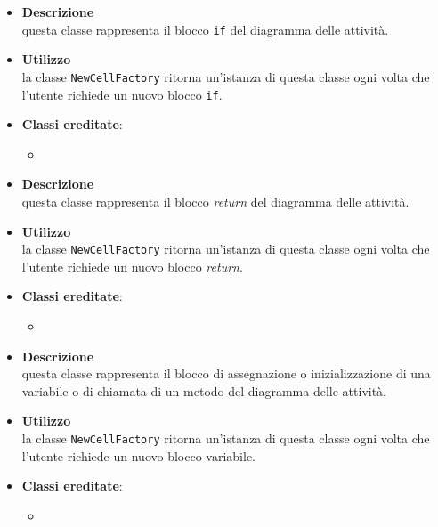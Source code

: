 \label{\nogloxy{swedesigner::client::model::celltypes::activity::HxIf}}
\begin{itemize}
\item \textbf{Descrizione}\\
questa classe rappresenta il blocco \texttt{if} del diagramma delle attività.
\item \textbf{Utilizzo}\\
la classe \texttt{NewCellFactory} ritorna un'istanza di questa classe ogni volta che l'utente richiede un nuovo blocco \texttt{if}.
\item \textbf{Classi ereditate}:
\begin{itemize}
\item \hyperref[\nogloxy{swedesigner::client::model::celltypes::activity::ActivityDiagramElement}]{}
\end{itemize}
\end{itemize}

\label{\nogloxy{swedesigner::client::model::celltypes::activity::HxReturn}}
\begin{itemize}
\item \textbf{Descrizione}\\
questa classe rappresenta il blocco \emph{return} del diagramma delle attività.
\item \textbf{Utilizzo}\\
la classe \texttt{NewCellFactory} ritorna un'istanza di questa classe ogni volta che l'utente richiede un nuovo blocco \emph{return}.
\item \textbf{Classi ereditate}:
\begin{itemize}
\item \hyperref[\nogloxy{swedesigner::client::model::celltypes::activity::ActivityDiagramElement}]{}
\end{itemize}
\end{itemize}

\label{\nogloxy{swedesigner::client::model::celltypes::activity::HxVariable}}
\begin{itemize}
\item \textbf{Descrizione}\\
questa classe rappresenta il blocco di assegnazione o inizializzazione di una variabile o di chiamata di un metodo del diagramma delle attività.
\item \textbf{Utilizzo}\\
la classe \texttt{NewCellFactory} ritorna un'istanza di questa classe ogni volta che l'utente richiede un nuovo blocco variabile.
\item \textbf{Classi ereditate}:
\begin{itemize}
\item \hyperref[\nogloxy{swedesigner::client::model::celltypes::activity::ActivityDiagramElement}]{}
\end{itemize}
\end{itemize}

